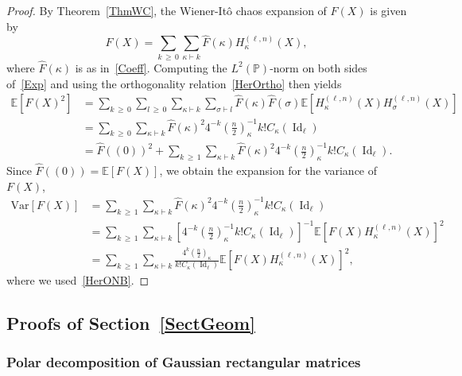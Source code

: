 \documentclass[10pt]{amsart}
\theoremstyle{definition}\newtheorem{defi}[theo]{Definition}\newtheorem{rema}[theo]{Remark}\newtheorem{exam}[theo]{Example}\newtheorem{exem}[theo]{Example}\newtheorem{nota}[theo]{Notation}
\DeclareMathOperator{\Id}{Id}
\newcommand{\Prob}{\mathbb{P}}
\newcommand{\E}[1]{\mathbb{E}\left[#1\right]}
\newcommand{\V}[1]{\mathrm{Var}{\left[#1\right]}}
\begin{document}
\begin{proof}
By Theorem~\ref{ThmWC}, the Wiener-Itô chaos expansion of $F(X)$ is given by
\begin{equation}\label{Exp}
F(X) = \sum_{k\,\geq\,0} \sum_{\kappa\vdash k} \widehat{F}(\kappa) H_{\kappa}^{(\ell,n)}(X),
\end{equation}
where $\widehat{F}(\kappa)$ is as in~\eqref{Coeff}. Computing the $L^2(\Prob)$-norm on both sides of~\eqref{Exp} and using the orthogonality relation~\eqref{HerOrtho} then yields
\begin{align*}
\E{F(X)^2} &= \sum_{k\,\geq\,0} \sum_{l\,\geq\,0}\sum_{\kappa \vdash k}
\sum_{\sigma \vdash l}
\widehat{F}(\kappa)
\widehat{F}(\sigma)
\E{H_{\kappa}^{(\ell,n)}(X) H_{\sigma}^{(\ell,n)}(X)} \\
&= \sum_{k\,\geq\,0}\sum_{\kappa \vdash k}
\widehat{F}(\kappa)^2 4^{-k}\left(\frac{n}{2}\right)_{\kappa}^{-1} k !C_{\kappa}(\Id_{\ell}) \\
&= \widehat{F}((0))^2 + \sum_{k\,\geq\,1} \sum_{\kappa\vdash k}
\widehat{F}(\kappa)^2 4^{-k}\left(\frac{n}{2}\right)_{\kappa}^{-1} k!C_{\kappa}(\Id_{\ell}).
\end{align*}
Since $\widehat{F}((0))=\E{F(X)}$, we obtain the expansion for the variance of $F(X)$,
\begin{align*}
\V{F(X)} &= \sum_{k\,\geq\,1}\sum_{\kappa\vdash k}
\widehat{F}(\kappa)^2 4^{-k}\left(\frac{n}{2}\right)_{\kappa}^{-1} k!C_{\kappa}(\Id_{\ell}) \\
&= \sum_{k\,\geq\,1}\sum_{\kappa \vdash k}
\left[4^{-k}\left(\frac{n}{2}\right)_{\kappa}^{-1} k!C_{\kappa}(\Id_{\ell}) \right]^{-1} \E{F(X) H_{\kappa}^{(\ell,n)}(X)}^2 \\
&= \sum_{k\,\geq\,1}\sum_{\kappa \vdash k}
\frac{4^{k}\left(\frac{n}{2}\right)_{\kappa}}{k!C_{\kappa}(\Id_{\ell}) }
\E{F(X) H_{\kappa}^{(\ell,n)}(X)}^2,
\end{align*}
where we used~\eqref{HerONB}.
\end{proof}

\subsection{Proofs of Section~\ref{SectGeom}}
\subsubsection*{Polar decomposition of Gaussian rectangular matrices}
\end{document}

